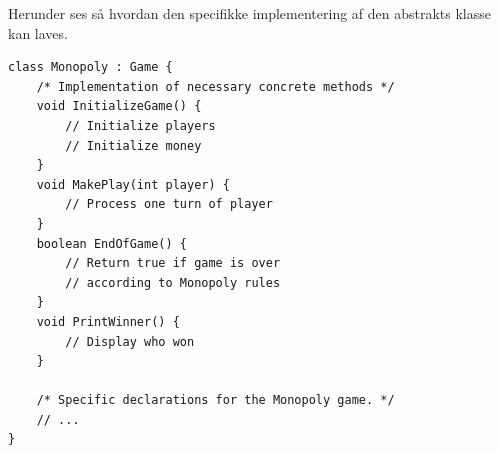 Herunder ses så hvordan den specifikke implementering af den abstrakts klasse kan laves.

\begin{lstlisting}
class Monopoly : Game {
	/* Implementation of necessary concrete methods */
	void InitializeGame() {
		// Initialize players
		// Initialize money
	}
	void MakePlay(int player) {
		// Process one turn of player
	}
	boolean EndOfGame() {
		// Return true if game is over 
		// according to Monopoly rules
	}
	void PrintWinner() {
		// Display who won
	}
	
	/* Specific declarations for the Monopoly game. */
	// ...
}
\end{lstlisting}





